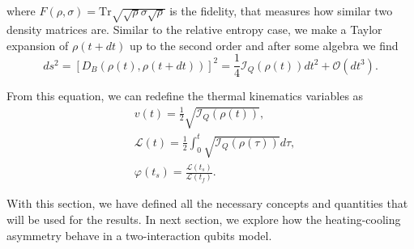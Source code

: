 \noindent where $F({\rho}, {\sigma}) = \text{Tr}\sqrt{\sqrt{{\rho}} {\sigma} \sqrt{{\rho}}}$ is the fidelity, that measures how similar two density matrices are. Similar to the relative entropy case, we make a Taylor expansion of ${\rho}(t+dt)$ up to the second order and after some algebra we find \cite{liu-2020}
\begin{equation}
    ds^2 = [D_B (\rho(t), \rho(t+dt))]^2 = \frac{1}{4} \mathcal{I}_Q ({\rho}(t)) dt^2 + \mathcal{O}(dt^3).
\end{equation}

\noindent From this equation, we can redefine the thermal kinematics variables as
\begin{align}
    &v(t) = \frac{1}{2} \sqrt{\mathcal{I}_Q ({\rho}(t))}, 
    \label{eq:velocidade}\\
    &\mathcal{L}(t) = \frac{1}{2} \int_0^{t} \sqrt{\mathcal{I}_Q ({\rho}(\tau))} d\tau,
    \label{eq:comprimento}\\
    &\varphi(t_s) = \frac{\mathcal{L}(t_s)}{\mathcal{L}(t_f)}. 
    \label{eq:completion}
\end{align}

With this section, we have defined all the necessary concepts and quantities that will be used for the results. In next section, we explore how the heating-cooling asymmetry behave in a two-interaction qubits model.
